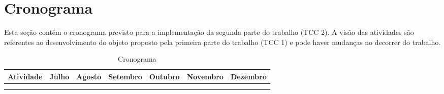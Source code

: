 \section{Cronograma}
\label{sec:cron}

Esta seção contém o cronograma previsto para a implementação da segunda
parte do trabalho (TCC 2). A visão das atividades são referentes ao
desenvolvimento do objeto proposto pela primeira parte do trabalho (TCC 1)
e pode haver mudanças no decorrer do trabalho.

\begin{table}[H]
  \centering
  \caption{Cronograma}
  \label{cron:tab}
  \begin{tabular}{|l|l|l|l|l|l|l|}
    \hline
    Atividade & Julho  & Agosto & Setembro & Outubro & Novembro & Dezembro \\ \hline
    &  &  &  &  &  &  \\ \hline
    &  &  &  &  &  &  \\ \hline
  \end{tabular}
\end{table}
